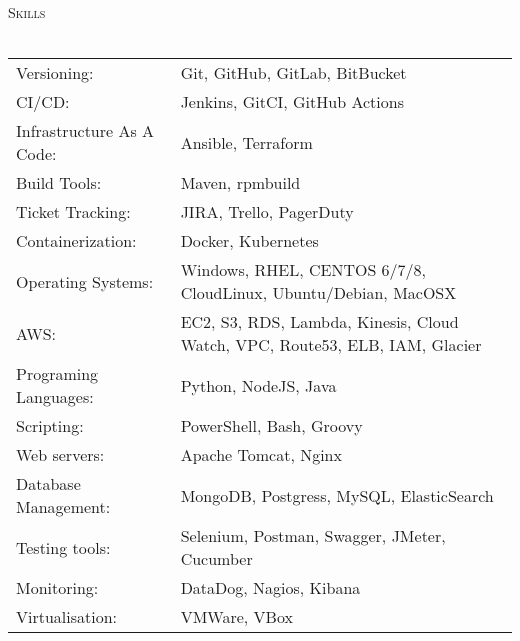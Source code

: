 \documentclass[a4paper]{article}
\newcommand{\lineunder} {
    \vspace*{-8pt} \\
    \hspace*{-18pt} \hrulefill \\
}
\newcommand{\header} [1] {
    {\hspace*{-18pt}\vspace*{6pt} \textsc{#1}}
    \vspace*{-6pt} \lineunder
}
\begin{document}
\header{Skills}
\begin{tabular}{ l l }
	Versioning:  & Git, GitHub, GitLab, BitBucket \\
	CI/CD:   & Jenkins, GitCI, GitHub Actions \\
	Infrastructure As A Code: &  Ansible, Terraform \\
	Build Tools:     &  Maven, rpmbuild \\
	Ticket Tracking:  &  JIRA, Trello, PagerDuty \\
	Containerization:  & Docker, Kubernetes \\
	Operating Systems:  &  Windows, RHEL, CENTOS 6/7/8, CloudLinux, Ubuntu/Debian, MacOSX \\
	AWS:  & EC2, S3, RDS, Lambda, Kinesis, Cloud Watch, VPC, Route53, ELB, IAM, Glacier \\
	Programing Languages: & Python, NodeJS, Java \\
	Scripting:  & PowerShell, Bash, Groovy \\
	Web servers:  & Apache Tomcat, Nginx \\
	Database Management:  & MongoDB, Postgress, MySQL, ElasticSearch \\
	Testing tools:  & Selenium, Postman, Swagger, JMeter, Cucumber \\
	Monitoring: & DataDog, Nagios, Kibana \\
	Virtualisation:  & VMWare, VBox \\
\end{tabular}
\vspace{2mm}





\ 
\end{document}
